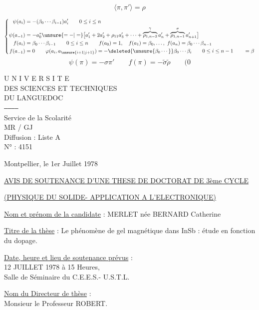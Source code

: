 \[
\boxed{\langle\pi,\pi'\rangle=\rho}
\]

\[
\left\{\begin{aligned}
\psi(a_i)&=-(\beta_0\cdots\beta_{i-1})a'_i\qquad 0\le i\le n\\
\psi(a_{-1})&=-a_0^*\unsure{=-|=}\bigl[a'_1+2a'_2+\rho_{11}a'_3+\cdots+\overbrace{\rho_{1,n-2}}^\gamma a'_n+\overbrace{\rho_{1,n-1}}^\sigma a'_{n+1}\bigr]\\
f(a_i)&=\beta_0\cdots\beta_{i-1}\qquad 0\le i\le n\qquad f(a_0)=1,\quad f(a_1)=\beta_0,\ldots,\ f(a_n)=\beta_0\cdots\beta_{n-1}\\
f(a_{-1})&=0\qquad \varphi(a_i,a_{\unsure{i+1|j+1}})=-\deleted{\unsure{\beta_0\cdots}}\beta_0\cdots\beta_i\qquad 0\le i\le n-1\qquad =\beta
\end{aligned}\right.
\]
\[
\psi(\pi)=-\sigma\pi'\qquad f(\pi)=-\widetilde{\sigma}\widetilde{\rho}\qquad(0
\]


U N I V E R S I T E\\
DES SCIENCES ET TECHNIQUES\\
DU LANGUEDOC\\
\texttt{------------}\\
Service de la Scolarité\\
MR / GJ\\
Diffusion : Liste A\\
N° : 4151

\unsure{-} Montpellier, le 1er Juillet 1978

\uline{AVIS DE SOUTENANCE D'UNE THESE DE DOCTORAT DE 3ème CYCLE}

\uline{(PHYSIQUE DU SOLIDE\quad - APPLICATION A L'ELECTRONIQUE\qquad )}

\uline{Nom et prénom de la candidate} : MERLET née BERNARD Catherine

\uline{Titre de la thèse} : Le phénomène de gel magnétique dans InSb : étude en fonction du dopage.

\uline{Date, heure et lieu de soutenance prévus} :\\
12 JUILLET 1978 à 15 Heures,\\
Salle de Séminaire du C.E.E.S.- U.S.T.L.

\uline{Nom du Directeur de thèse} :\\
Monsieur le Professeur ROBERT.

